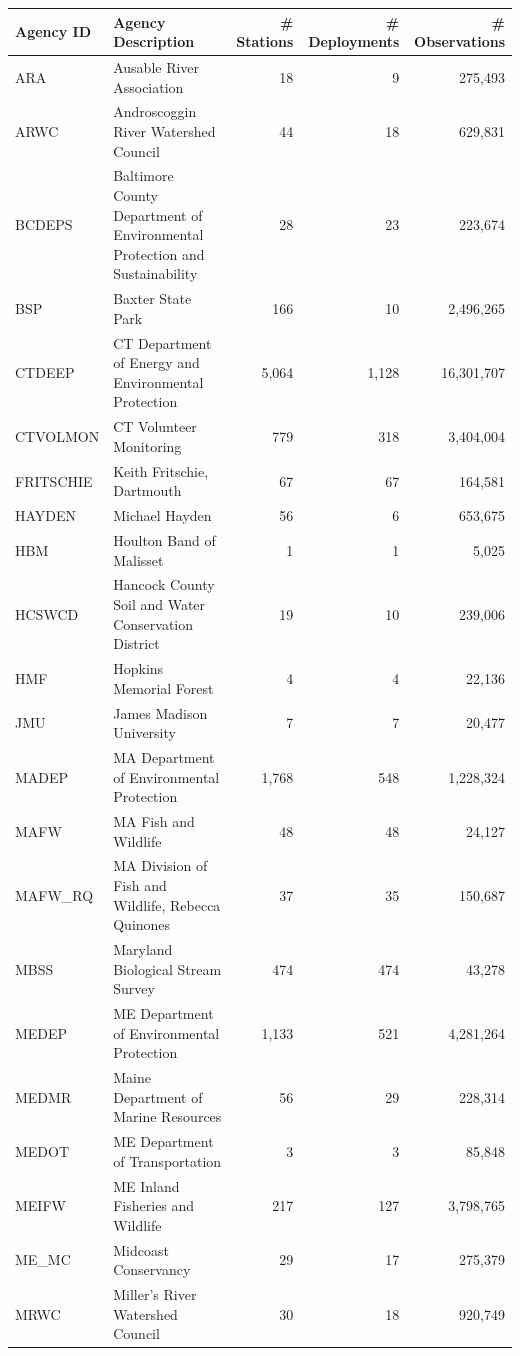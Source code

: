 \documentclass[]{book}
\begin{document}
\begin{tabular}{l|l|r|r|r}
\hline
Agency ID & Agency Description & \# Stations & \# Deployments & \# Observations\\
\hline
ARA & Ausable River Association & 18 & 9 & 275,493\\
\hline
ARWC & Androscoggin River Watershed Council & 44 & 18 & 629,831\\
\hline
BCDEPS & Baltimore County Department of Environmental Protection and Sustainability & 28 & 23 & 223,674\\
\hline
BSP & Baxter State Park & 166 & 10 & 2,496,265\\
\hline
CTDEEP & CT Department of Energy and Environmental Protection & 5,064 & 1,128 & 16,301,707\\
\hline
CTVOLMON & CT Volunteer Monitoring & 779 & 318 & 3,404,004\\
\hline
FRITSCHIE & Keith Fritschie, Dartmouth & 67 & 67 & 164,581\\
\hline
HAYDEN & Michael Hayden & 56 & 6 & 653,675\\
\hline
HBM & Houlton Band of Malisset & 1 & 1 & 5,025\\
\hline
HCSWCD & Hancock County Soil and Water Conservation District & 19 & 10 & 239,006\\
\hline
HMF & Hopkins Memorial Forest & 4 & 4 & 22,136\\
\hline
JMU & James Madison University & 7 & 7 & 20,477\\
\hline
MADEP & MA Department of Environmental Protection & 1,768 & 548 & 1,228,324\\
\hline
MAFW & MA Fish and Wildlife & 48 & 48 & 24,127\\
\hline
MAFW\_RQ & MA Division of Fish and Wildlife, Rebecca Quinones & 37 & 35 & 150,687\\
\hline
MBSS & Maryland Biological Stream Survey & 474 & 474 & 43,278\\
\hline
MEDEP & ME Department of Environmental Protection & 1,133 & 521 & 4,281,264\\
\hline
MEDMR & Maine Department of Marine Resources & 56 & 29 & 228,314\\
\hline
MEDOT & ME Department of Transportation & 3 & 3 & 85,848\\
\hline
MEIFW & ME Inland Fisheries and Wildlife & 217 & 127 & 3,798,765\\
\hline
ME\_MC & Midcoast Conservancy & 29 & 17 & 275,379\\
\hline
MRWC & Miller's River Watershed Council & 30 & 18 & 920,749\\

\end{tabular}
\end{document}
